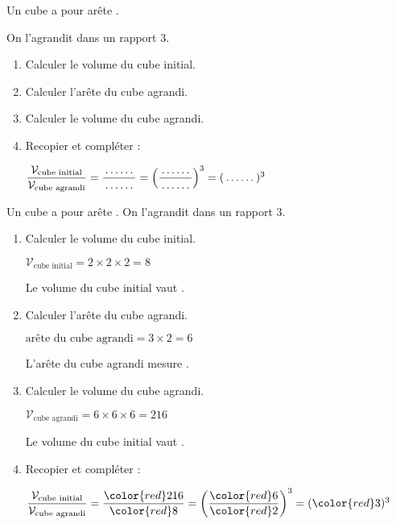 \begin{exercice*}
    Un cube a pour arête .
    
    On l'agrandit dans un rapport $3$.
    \begin{enumerate}
        \item Calculer le volume du cube initial.
        \item Calculer l'arête du cube agrandi.
        \item Calculer le volume du cube agrandi.
        \item Recopier et compléter :
        
        \smallskip
        $\dfrac{\mathcal{V}_{\text{cube initial}}}{\mathcal{V}_{\text{cube agrandi}}}=\dfrac{\makebox[1cm]{\dotfill}}{\makebox[1cm]{\dotfill}}=\left(\dfrac{\makebox[1cm]{\dotfill}}{\makebox[1cm]{\dotfill}}\right)^3=(\makebox[1cm]{\dotfill})^3$
    \end{enumerate}
\end{exercice*}
\begin{corrige}
    \phantom{rrr} 
    
    \begin{multicols}{2}
        Un cube a pour arête . On l'agrandit dans un rapport $3$.

        \begin{enumerate}
            \item Calculer le volume du cube initial.
            
            {\color{red}$\mathcal{V}_{\text{cube initial}}=2\times 2\times 2 = 8$
            
            Le volume du cube initial vaut .
            }
            \item Calculer l'arête du cube agrandi.        
            
            {\color{red} $\text{arête du cube agrandi} = 3\times 2 = 6$
            
            L'arête du cube agrandi mesure .
            }
            \columnbreak
            \item Calculer le volume du cube agrandi.
            
            {\color{red}$\mathcal{V}_{\text{cube agrandi}}=6\times 6\times 6 = 216$
            
            Le volume du cube initial vaut .
            }
            \item Recopier et compléter :
            
            \smallskip
            $\dfrac{\mathcal{V}_{\text{cube initial}}}{\mathcal{V}_{\text{cube agrandi}}}=\dfrac{{\color{red}216}}{{\color{red}8}}=\left(\dfrac{{\color{red}6}}{{\color{red}2}}\right)^3=({\color{red}3})^3$
        \end{enumerate}
    \end{multicols}
\end{corrige}